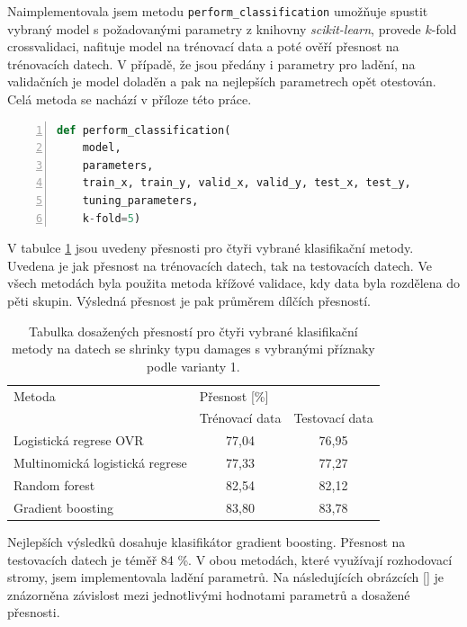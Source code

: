 Naimplementovala jsem metodu \texttt{perform\_classification} umožňuje spustit vybraný model s požadovanými parametry z knihovny \emph{scikit-learn}, provede $k$-fold crossvalidaci, nafituje model na trénovací data a poté ověří přesnost na trénovacích datech. V případě, že jsou předány i parametry pro ladění, na validačních je model doladěn a pak na nejlepších parametrech opět otestován. Celá metoda se nachází v příloze této práce. %

\begin{lstlisting}[language=Python, frame=none, numbers=left, numberstyle=\numberstyle, backgroundcolor=\color{backcolour}]
def perform_classification(
    model, 
    parameters, 
    train_x, train_y, valid_x, valid_y, test_x, test_y,
    tuning_parameters, 
    k-fold=5)
\end{lstlisting}

V tabulce \ref*{tab:klasifikace:VIF} jsou uvedeny přesnosti pro čtyři vybrané klasifikační metody. Uvedena je jak přesnost na trénovacích datech, tak na testovacích datech. Ve všech metodách byla použita metoda křížové validace, kdy data byla rozdělena do pěti skupin. Výsledná přesnost je pak průměrem dílčích přesností.

\begin{table}[hbtp!]
    \captionsetup{justification=centering}
    \caption{Tabulka dosažených přesností pro čtyři vybrané klasifikační metody na datech se shrinky typu damages s vybranými příznaky podle varianty 1.}
    \begin{tabular}{lcc}
        Metoda         & \multicolumn{2}{l}{Přesnost {[}\%{]}} \\
                                        & Trénovací data    & Testovací data    \\ \hline
        Logistická regrese OVR          & 77,04             & 76,95             \\
        Multinomická logistická regrese & 77,33             & 77,27             \\
        Random forest                   & 82,54             & 82,12             \\
        Gradient boosting               & 83,80             & 83,78            
        \end{tabular}
    \label{tab:klasifikace:VIF}
\end{table}


Nejlepších výsledků dosahuje klasifikátor gradient boosting. Přesnost na testovacích datech je téměř 84 \%. V obou metodách, které využívají rozhodovací stromy, jsem implementovala ladění parametrů. Na následujících obrázcích \ref{} %
je znázorněna závislost mezi jednotlivými hodnotami parametrů a dosažené přesnosti.


